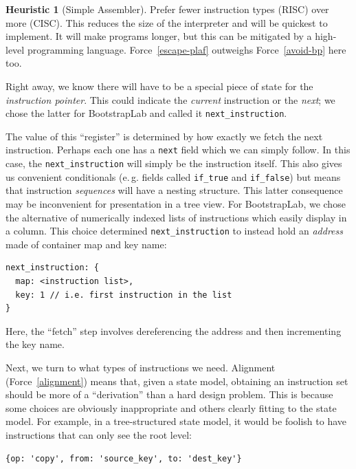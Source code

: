 \documentclass[ twoside,openright,titlepage,numbers=noenddot,headinclude,footinclude,cleardoublepage=empty,abstract=on,
                BCOR=5mm,paper=a4,fontsize=11pt
                ]{scrreprt}
\newcommand{\eg}{e.\,g.}
\theoremstyle{definition}
\newtheorem{heuristic}{Heuristic}
\begin{document}
\begin{heuristic}[Simple Assembler]
\label{simple-asm}
Prefer fewer instruction types (RISC) over more (CISC). This reduces the size of the interpreter and will be quickest to implement. It will make programs longer, but this can be mitigated by a high-level programming language. Force\ \ref{escape-plaf} outweighs Force\ \ref{avoid-bp} here too.
\end{heuristic}

Right away, we know there will have to be a special piece of state for
the \emph{instruction pointer}. This could indicate the \emph{current}
instruction or the \emph{next}; we chose the latter for BootstrapLab and
called it \texttt{next\_instruction}.

The value of this ``register'' is determined by how exactly we fetch the
next instruction. Perhaps each one has a \texttt{next} field which we
can simply follow. In this case, the \texttt{next\_instruction} will
simply be the instruction itself. This also gives us convenient
conditionals (\eg{} fields called \texttt{if\_true} and
\texttt{if\_false}) but means that instruction \emph{sequences} will
have a nesting structure. This latter consequence may be inconvenient
for presentation in a tree view. For BootstrapLab, we chose the
alternative of numerically indexed lists of instructions which easily
display in a column. This choice determined \texttt{next\_instruction}
to instead hold an \emph{address} made of container map and key name:

\begin{verbatim}
next_instruction: {
  map: <instruction list>,
  key: 1 // i.e. first instruction in the list
}
\end{verbatim}

Here, the ``fetch'' step involves dereferencing the address and then
incrementing the key name.

Next, we turn to what types of instructions we need. Alignment
(Force~\ref{alignment}) means that, given a state model, obtaining an
instruction set should be more of a ``derivation'' than a hard design
problem. This is because some choices are obviously inappropriate and
others clearly fitting to the state model. For example, in a
tree-structured state model, it would be foolish to have instructions
that can only see the root level:

\begin{verbatim}
{op: 'copy', from: 'source_key', to: 'dest_key'}
\end{verbatim}
\end{document}
